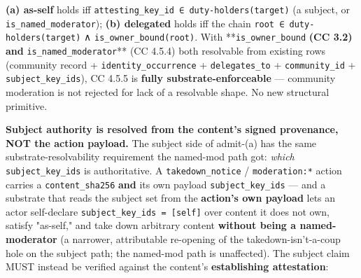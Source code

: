 \documentclass[11pt]{article}
\begin{document}
\textbf{(a) as-self} holds iff \texttt{attesting\_key\_id ∈ duty-holders(target)} (a subject, or \texttt{is\_named\_moderator}); \textbf{(b) delegated} holds iff the chain \texttt{root ∈ duty-holders(target)} ∧ \texttt{is\_owner\_bound(root)}. With **\texttt{is\_owner\_bound}\textbf{ (CC 3.2) and }\texttt{is\_named\_moderator}** (CC 4.5.4) both resolvable from existing rows (community record + \texttt{identity\_occurrence} + \texttt{delegates\_to} + \texttt{community\_id} + \texttt{subject\_key\_ids}), CC 4.5.5 is \textbf{fully substrate-enforceable} — community moderation is not rejected for lack of a resolvable shape. No new structural primitive.


\textbf{Subject authority is resolved from the content's signed provenance, NOT the action payload.} The subject side of admit-(a) has the same substrate-resolvability requirement the named-mod path got: \textit{which} \texttt{subject\_key\_ids} is authoritative. A \texttt{takedown\_notice} / \texttt{moderation:*} action carries a \texttt{content\_sha256} \textbf{and} its own payload \texttt{subject\_key\_ids} — and a substrate that reads the subject set from the \textbf{action's own payload} lets an actor self-declare \texttt{subject\_key\_ids = [self]} over content it does not own, satisfy "as-self," and take down arbitrary content \textbf{without being a named-moderator} (a narrower, attributable re-opening of the takedown-isn't-a-coup hole on the subject path; the named-mod path is unaffected). The subject claim MUST instead be verified against the content's \textbf{establishing attestation}:
\end{document}
